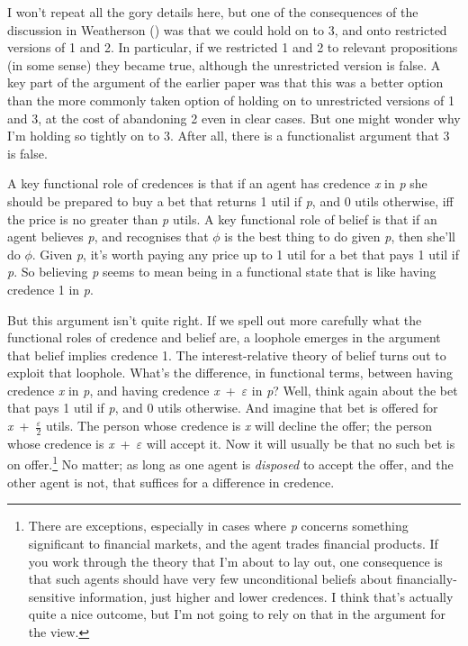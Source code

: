 \documentclass[
  10pt,
  letterpaper,
  DIV=11,
  numbers=noendperiod,
  twoside]{scrartcl}
\begin{document}
I won't repeat all the gory details here, but one of the consequences of
the discussion in Weatherson
() was that we could hold on
to 3, and onto restricted versions of 1 and 2. In particular, if we
restricted 1 and 2 to relevant propositions (in some sense) they became
true, although the unrestricted version is false. A key part of the
argument of the earlier paper was that this was a better option than the
more commonly taken option of holding on to unrestricted versions of 1
and 3, at the cost of abandoning 2 even in clear cases. But one might
wonder why I'm holding so tightly on to 3. After all, there is a
functionalist argument that 3 is false.

A key functional role of credences is that if an agent has credence
\emph{x} in \emph{p} she should be prepared to buy a bet that returns 1
util if \emph{p}, and 0 utils otherwise, iff the price is no greater
than \emph{p} utils. A key functional role of belief is that if an agent
believes \emph{p}, and recognises that \(\phi\) is the best thing to do
given \emph{p}, then she'll do \(\phi\). Given \emph{p}, it's worth
paying any price up to 1 util for a bet that pays 1 util if \emph{p}. So
believing \emph{p} seems to mean being in a functional state that is
like having credence 1 in \emph{p}.

But this argument isn't quite right. If we spell out more carefully what
the functional roles of credence and belief are, a loophole emerges in
the argument that belief implies credence 1. The interest-relative
theory of belief turns out to exploit that loophole. What's the
difference, in functional terms, between having credence \emph{x} in
\emph{p}, and having credence \emph{x}~+~\(\varepsilon\) in \emph{p}?
Well, think again about the bet that pays 1 util if \emph{p}, and 0
utils otherwise. And imagine that bet is offered for
\emph{x}~+~\(\frac{\varepsilon}{2}\) utils. The person whose credence is
\emph{x} will decline the offer; the person whose credence is
\emph{x}~+~\(\varepsilon\) will accept it. Now it will usually be that
no such bet is on offer.\footnote{There are exceptions, especially in
  cases where \emph{p} concerns something significant to financial
  markets, and the agent trades financial products. If you work through
  the theory that I'm about to lay out, one consequence is that such
  agents should have very few unconditional beliefs about
  financially-sensitive information, just higher and lower credences. I
  think that's actually quite a nice outcome, but I'm not going to rely
  on that in the argument for the view.} No matter; as long as one agent
is \emph{disposed} to accept the offer, and the other agent is not, that
suffices for a difference in credence.
\end{document}
